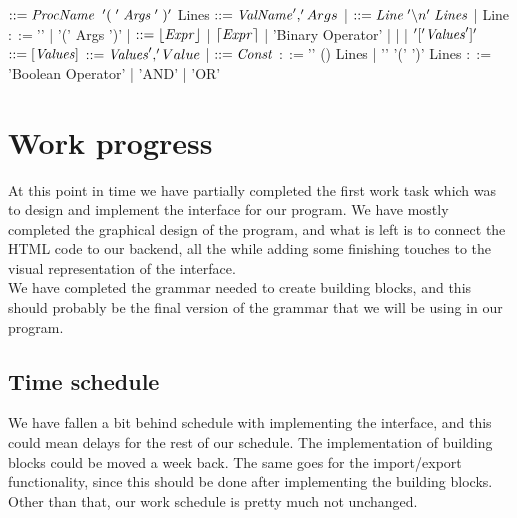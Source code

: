 \documentclass[11pt]{article}
\begin{document}
\begin{codebox}
\zi {} $::= \id{ProcName} \;\;'(\;'\; \id{Args} \;'\;)'$
\zi \quad\quad\quad\quad\quad\quad\quad Lines
\zi {} $::= \id{ValName} ',' Args$
\zi \quad\quad\quad| 
\zi {} $::= \id{Line}\; '\backslash n'\; \id{Lines}$
\zi \quad\quad\quad| Line
\zi {} $::=$'' 
\zi  \quad\quad\quad|  '(' Args ')'
\zi \quad\quad\quad| 
\zi {} $::=\left \lfloor{\id{Expr}}\right \rfloor  $
\zi \quad\quad\quad| $\left \lceil{\id{Expr}}\right \rceil $
\zi \quad\quad\quad|  'Binary Operator' 
\zi \quad\quad\quad| 
\zi \quad\quad\quad| 
\zi \quad\quad\quad| $'['\id{Values}']'$
\zi {} $::=[\id{Values}]$
\zi {} $::= \id{Values} ',' Value$
\zi \quad\quad\quad| 
\zi {} $::= \id{Const}$
\zi {} $::= $'' ()
\zi \quad\quad\quad\quad Lines
\zi \quad\quad\quad| '' '('  ')'
\zi \quad\quad\quad\quad Lines
\zi {} $::=$  'Boolean Operator' 
\zi \quad\quad\quad|  'AND' 
\zi \quad\quad\quad|  'OR' 
\end{codebox}

\newpage

\section{Work progress}
At this point in time we have partially completed the first work task which was to design and implement the interface for our program. We have mostly completed the graphical design of the program, and what is left is to connect the HTML code to our backend, all the while adding some finishing touches to the visual representation of the interface.\\
We have completed the grammar needed to create building blocks, and this should probably be the final version of the grammar that we will be using in our program.
\\
\subsection{Time schedule}
We have fallen a bit behind schedule with implementing the interface, and this could mean delays for the rest of our schedule. The implementation of building blocks could be moved a week back. The same goes for the import/export functionality, since this should be done after implementing the building blocks. Other than that, our work schedule is pretty much not unchanged.
\end{document}

